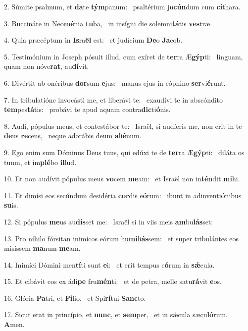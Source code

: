 2. Súmite psalmum, et \textbf{da}te \textbf{tým}panum: \ast\  psaltérium ju\textbf{cún}dum cum \textbf{cí}thara.\

3. Buccináte in Neo\textbf{mé}nia \textbf{tu}ba, \ast\  in insígni die solemni\textbf{tá}tis \textbf{ves}træ.\

4. Quia præcéptum in \textbf{Is}ra\textbf{ël} est: \ast\  et judícium \textbf{De}o \textbf{Ja}cob.\

5. Testimónium in Joseph pósuit illud, cum exíret de \textbf{ter}ra Æ\textbf{gýp}ti: \ast\  linguam, quam non nóve\textbf{rat}, au\textbf{dí}vit.\

6. Divértit ab onéribus \textbf{dor}sum \textbf{e}jus: \ast\  manus ejus in cóphino \textbf{ser}vi\textbf{é}runt.\

7. In tribulatióne invocásti me, et liberávi te: \dag\  exaudívi te in abscóndito \textbf{tem}pes\textbf{tá}tis: \ast\  probávi te apud aquam contra\textbf{dic}ti\textbf{ó}nis.\

8. Audi, pópulus meus, et contestábor te: \dag\  Israël, si audíeris me, non erit in te \textbf{de}us \textbf{re}cens, \ast\  neque adorábis deum \textbf{a}li\textbf{é}num.\

9. Ego enim sum Dóminus Deus tuus, qui edúxi te de \textbf{ter}ra Æ\textbf{gýp}ti: \ast\  diláta os tuum, et im\textbf{plé}bo \textbf{il}lud.\

10. Et non audívit pópulus meus \textbf{vo}cem \textbf{me}am: \ast\  et Israël non in\textbf{tén}dit \textbf{mi}hi.\

11. Et dimísi eos secúndum desidéria \textbf{cor}dis e\textbf{ó}rum: \ast\  ibunt in adinventi\textbf{ó}nibus \textbf{su}is.\

12. Si pópulus \textbf{me}us au\textbf{dís}set me: \ast\  Israël si in viis meis \textbf{am}bu\textbf{lás}set:\

13. Pro níhilo fórsitan inimícos eórum hu\textbf{mi}li\textbf{ás}sem: \ast\  et super tribulántes eos misíssem \textbf{ma}num \textbf{me}am.\

14. Inimíci Dómini men\textbf{tí}ti sunt \textbf{e}i: \ast\  et erit tempus e\textbf{ó}rum in \textbf{sǽ}cula.\

15. Et cibávit eos ex ádi\textbf{pe} fru\textbf{mén}ti: \ast\  et de petra, melle satu\textbf{rá}vit \textbf{e}os.\

16. Glória \textbf{Pa}tri, et \textbf{Fí}lio, \ast\  et Spi\textbf{rí}tui \textbf{Sanc}to.\

17. Sicut erat in princípio, et \textbf{nunc}, et \textbf{sem}per, \ast\  et in sǽcula sæcu\textbf{ló}rum. \textbf{A}men.\

